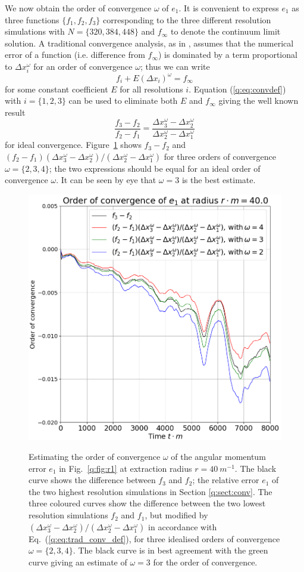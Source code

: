 We now obtain the order of convergence $\omega$ of $e_1$. It is convenient to express $e_1$ as three functions $\{f_1,f_2,f_3\}$ corresponding to the three different resolution simulations with $N=\{320,384,448\}$ and $f_\infty$ to denote the continuum limit solution. A traditional convergence analysis, as in \cite{PresTeukVettFlan92}, assumes that the numerical error of a function (i.e. difference from $f_\infty$) is dominated by a term proportional to $\Delta x_i^\omega$ for an order of convergence $\omega$; thus we can write
\begin{equation}\label{q:eq:convdef}f_i + E (\Delta x_i)^\omega = f_\infty\end{equation} 
for some constant coefficient $E$ for all resolutions $i$. Equation (\ref{q:eq:convdef}) with $i=\{1,2,3\}$ can be used to eliminate both $E$ and $f_\infty$ giving the well known result
\begin{equation}
\label{q:eq:trad_conv_def}\frac{f_3-f_2}{f_2-f_1} = \frac{ \Delta x_3^\omega-\Delta x_2^\omega }{ \Delta x_2^\omega-\Delta x_1^\omega }
\end{equation}
for ideal convergence. Figure~\ref{q:fig:234} shows $f_3-f_2$ and $(f_2-f_1 )(\Delta x_3^\omega - \Delta x_2^\omega)/(\Delta x_2^\omega - \Delta x_1^\omega)$ for three orders of convergence $\omega=\{2,3,4\}$; the two expressions should be equal for an ideal order of convergence $\omega$. It can be seen by eye that $\omega=3$ is the best estimate.
\begin{figure}[h]
{\includegraphics[width=0.65\columnwidth]{png/paper_conv123.png}}
\caption{Estimating the order of convergence $\omega$ of the angular momentum error $e_1$ in Fig.~\ref{q:fig:r1} at extraction radius $r=40 ~m^{-1}$. The black curve shows the difference between $f_3$ and $f_2$; the relative error $e_1$ of the two highest resolution simulations in Section \ref{q:sect:conv}. The three coloured curves show the difference between the two lowest resolution simulations $f_2$ and $f_1$, but modified by $(\Delta x_3^\omega - \Delta x_2^\omega)/(\Delta x_2^\omega - \Delta x_1^\omega)$ in accordance with Eq.~(\ref{q:eq:trad_conv_def}), for three idealised orders of convergence $\omega=\{2,3,4\}$. The black curve is in best agreement with the green curve giving an estimate of $\omega=3$ for the order of convergence. }
\label{q:fig:234}
\end{figure}



